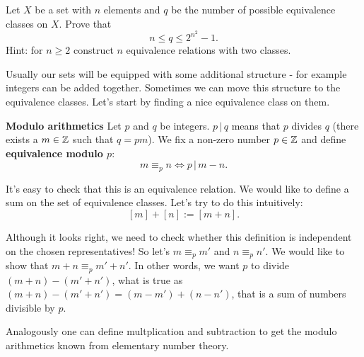 \begin{exercise}
  Let $X$ be a set with $n$ elements and $q$ be the number of possible equivalence classes on $X$. Prove that $$n\le q \le 2^{n^2}-1.$$ Hint: for $n\ge 2$ construct $n$ equivalence relations with two classes.
\end{exercise}

Usually our sets will be equipped with some additional structure - for example integers can be added together. Sometimes we can move this structure to the equivalence classes. Let's start by finding a nice equivalence class on them.

\begin{example}
  \textbf{Modulo arithmetics}
  Let $p$ and $q$ be integers. $p\,|\,q$ means that $p$ divides $q$ (there exists a $m\in \mathbb Z$ such that $q=pm$). We fix a non-zero number $p\in \mathbb Z$ and define \textbf{equivalence modulo $p$}:
  $$m\equiv_p n \Leftrightarrow p\,|\,m-n.$$

  It's easy to check that this is an equivalence relation. We would like to define a sum on the set of equivalence classes. Let's try to do this intuitively:
  $$[m] + [n] := [m+n].$$

  Although it looks right, we need to check whether this definition is independent on the chosen representatives! So let's $m\equiv_p m'$ and $n\equiv_p n'$. We would like to show
  that $m+n\equiv_p m'+n'$. In other words, we want $p$ to divide $(m+n)-(m'+n')$, what is true as $(m+n)-(m'+n')=(m-m')+(n-n')$, that is a sum of numbers divisible by $p$.
\end{example}

Analogously one can define multplication and subtraction to get the modulo arithmetics known from elementary number theory.

